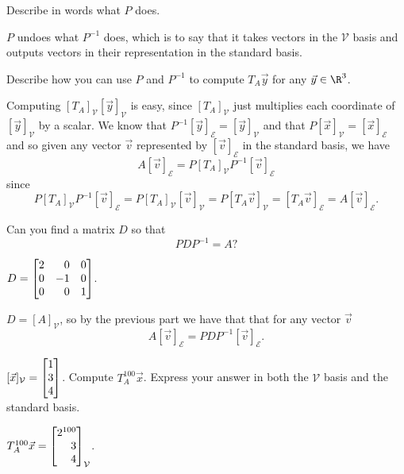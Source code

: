 	\begin{parts}
		\item Describe in words what $P$ does.
			\begin{solution}
				$P$ undoes what $P^{-1}$ does, which is to say that it takes vectors
				in the $\mathcal V$ basis and outputs vectors in their representation
				in the standard basis.
			\end{solution}
		\item Describe how you can use $P$ and $P^{-1}$ to compute
			$T_A\vec y$ for any $\vec y\in \R^3$.
			\begin{solution}
				Computing $[T_A]_{\mathcal V}[\vec y]_{\mathcal V}$ is easy, since
				$[T_A]_{\mathcal V}$ just multiplies each coordinate of $[\vec y]_{\mathcal V}$
				by a scalar. We know that $P^{-1}[\vec y]_{\mathcal E}=[\vec y]_{\mathcal V}$ 
				and that $P[\vec x]_{\mathcal V}=[\vec x]_{\mathcal E}$ and so 
				given any vector $\vec v$ represented by $[\vec v]_{\mathcal E}$
				in the standard basis, we have
				\[
					A[\vec v]_{\mathcal E}=P[T_A]_{\mathcal V}P^{-1}[\vec v]_{\mathcal E}
				\]
				since
				\[
					P[T_A]_{\mathcal V}P^{-1}[\vec v]_{\mathcal E}
					=P[T_A]_{\mathcal V}[\vec v]_{\mathcal V}
					=P[T_A\vec v]_{\mathcal V}
					=[T_A\vec v]_{\mathcal E}
					=A[\vec v]_{\mathcal E}.
				\]
			\end{solution}
		\item Can you find a matrix $D$ so that
			\[
				PDP^{-1}=A?
			\]
			\begin{solution}
				$D=\mat{2&0&0\\0&-1&0\\0&0&1}$.

				$D=[A]_{\mathcal V}$, so by the previous part we have that
				that for any vector $\vec v$
				\[
					A[\vec v]_{\mathcal E}=PDP^{-1}[\vec v]_{\mathcal E}.
				\]
			\end{solution}
		\item $[\vec x]_{\mathcal V}=\mat{1\\3\\4}$.  Compute $T_A^{100}\vec x$. Express
			your answer in both the $\mathcal V$ basis and the standard basis.
			\begin{solution}
				$T_A^{100}\vec x=\mat{2^{100}\\3\\4}_{\mathcal V}$.


\end{solution}
\end{parts}
